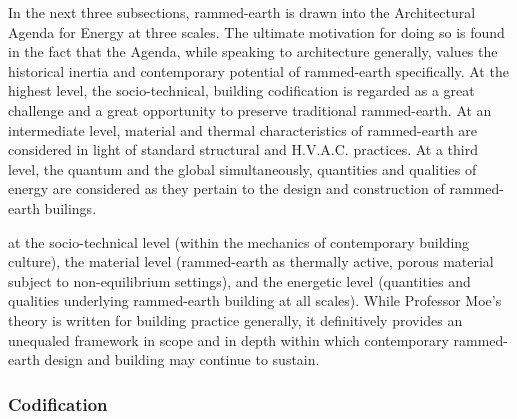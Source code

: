 In the next three subsections, rammed-earth is drawn into the Architectural Agenda for Energy at three scales. The ultimate motivation for doing so is found in the fact that the Agenda, while speaking to architecture generally, values the historical inertia and contemporary potential of rammed-earth specifically. At the highest level, the socio-technical, building codification is regarded as a great challenge and a great opportunity to preserve traditional rammed-earth. At an intermediate level, material and thermal characteristics of rammed-earth are considered in light of standard structural and H.V.A.C. practices. At a third level, the quantum and the global simultaneously, quantities and qualities of energy are considered as they pertain to the design and construction of rammed-earth builings.        

at the socio-technical level (within the mechanics of contemporary building culture), the material level (rammed-earth as thermally active, porous material subject to non-equilibrium settings), and the energetic level (quantities and qualities underlying rammed-earth building at all scales). While Professor Moe's theory is written for building practice generally, it definitively provides an unequaled framework in scope and in depth within which contemporary rammed-earth design and building may continue to sustain.

\subsubsection{Codification}
